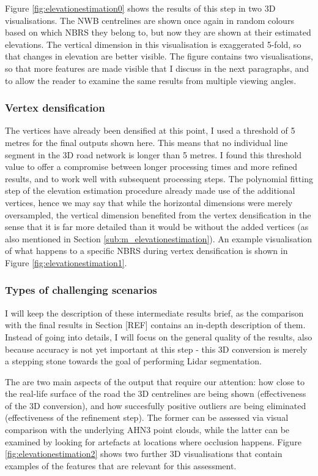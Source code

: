 Figure \ref{fig:elevationestimation0} shows the results of this step in two 3D visualisations. The NWB centrelines are shown once again in random colours based on which NBRS they belong to, but now they are shown at their estimated elevations. The vertical dimension in this visualisation is exaggerated 5-fold, so that changes in elevation are better visible. The figure contains two visualisations, so that more features are made visible that I discuss in the next paragraphs, and to allow the reader to examine the same results from multiple viewing angles.

\subsubsection{Vertex densification}

The vertices have already been densified at this point, I used a threshold of 5 metres for the final outputs shown here. This means that no individual line segment in the 3D road network is longer than 5 metres. I found this threshold value to offer a compromise between longer processing times and more refined results, and to work well with subsequent processing steps. The polynomial fitting step of the elevation estimation procedure already made use of the additional vertices, hence we may say that while the horizontal dimensions were merely oversampled, the vertical dimension benefited from the vertex densification in the sense that it is far more detailed than it would be without the added vertices (as also mentioned in Section \ref{sub:m_elevationestimation}). An example visualisation of what happens to a specific NBRS during vertex densification is shown in Figure \ref{fig:elevationestimation1}.

\subsubsection{Types of challenging scenarios}

I will keep the description of these intermediate results brief, as the comparison with the final results in Section [REF] contains an in-depth description of them. Instead of going into details, I will focus on the general quality of the results, also because accuracy is not yet important at this step - this 3D conversion is merely a stepping stone towards the goal of performing Lidar segmentation.

The are two main aspects of the output that require our attention: how close to the real-life surface of the road the 3D centrelines are being shown (effectiveness of the 3D conversion), and how succesfully positive outliers are being eliminated (effectiveness of the refinement step). The former can be assessed via visual comparison with the underlying AHN3 point clouds, while the latter can be examined by looking for artefacts at locations where occlusion happens. Figure \ref{fig:elevationestimation2} shows two further 3D visualisations that contain examples of the features that are relevant for this assessment.

